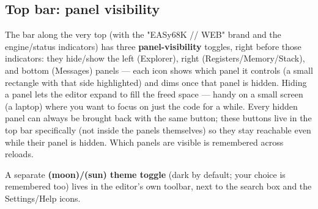 \subsection*{Top bar: panel visibility}
The bar along the very top (with the "EASy68K // WEB" brand and the engine/status indicators) has three \textbf{panel-visibility} toggles, right before those indicators: they hide/show the left (Explorer), right (Registers/Memory/Stack), and bottom (Messages) panels — each icon shows which panel it controls (a small rectangle with that side highlighted) and dims once that panel is hidden. Hiding a panel lets the editor expand to fill the freed space — handy on a small screen (a laptop) where you want to focus on just the code for a while. Every hidden panel can always be brought back with the same button; these buttons live in the top bar specifically (not inside the panels themselves) so they stay reachable even while their panel is hidden. Which panels are visible is remembered across reloads.

A separate \textbf{(moon)/(sun) theme toggle} (dark by default; your choice is remembered too) lives in the editor's own toolbar, next to the search box and the Settings/Help icons.
